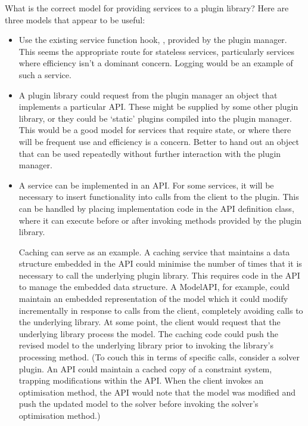 \documentclass{article}
\begin{document}
What is the correct model for providing services to a plugin library?
Here are three models that appear to be useful:
\begin{itemize}
  \item
  Use the existing service function hook, , provided
  by the plugin manager.
  This seems the appropriate route for stateless services, particularly
  services where efficiency isn't a dominant concern.
  Logging would be an example of such a service.

  \item
  A plugin library could request from the plugin manager an object that
  implements a particular API\@.
  These might be supplied by some other plugin library, or they could be
  `static' plugins compiled into the plugin manager.
  This would be a good model for services that require state, or where
  there will be frequent use and efficiency is a concern.
  Better to hand out an object that can be used repeatedly without further
  interaction with the plugin manager.

  \item
  A service can be implemented in an API\@.
  For some services, it will be necessary to insert functionality into
  calls from the client to the plugin.
  This can be handled by placing implementation code in the API definition
  class, where it can execute before or after invoking methods provided by the
  plugin library.

  Caching can serve as an example.
  A caching service that maintains a data structure embedded in the API
  could minimise the number of times
  that it is necessary to call the underlying plugin library.
  This requires code in the API to manage the embedded data structure.
  A ModelAPI, for example, could maintain an embedded representation
  of the model which it could modify incrementally in response to calls from
  the client, completely avoiding calls to the underlying library.
  At some point, the client would request that the underlying library process
  the model.
  The caching code could push the revised model to the underlying library
  prior to invoking the library's processing method.
  (To couch this in terms of specific calls, consider a solver plugin.
  An API could maintain a cached copy of a constraint system, trapping
  modifications within the API.
  When the client invokes an optimisation method, the API would note that
  the model was modified and push the updated model to the solver before
  invoking the solver's optimisation method.)
\end{itemize}




\end{document}
